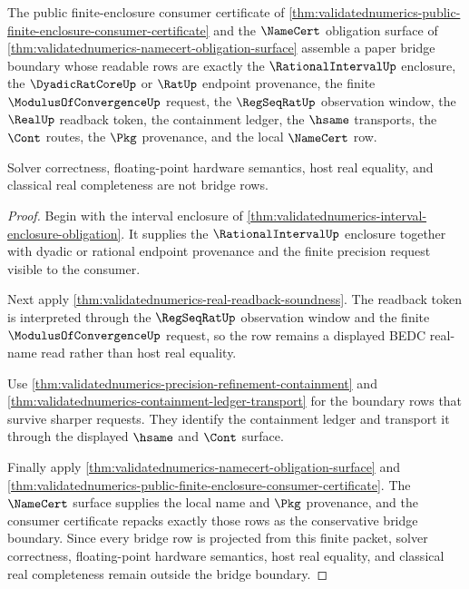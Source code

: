 \begin{theorem}
\label{thm:validatednumerics-validated-enclosure-bridge-boundary}
The public finite-enclosure consumer certificate of
\autoref{thm:validatednumerics-public-finite-enclosure-consumer-certificate}
and the $\NameCert$ obligation surface of
\autoref{thm:validatednumerics-namecert-obligation-surface} assemble a paper
bridge boundary whose readable rows are exactly the $\RationalIntervalUp$
enclosure, the $\DyadicRatCoreUp$ or $\RatUp$ endpoint provenance, the finite
$\ModulusOfConvergenceUp$ request, the $\RegSeqRatUp$ observation window, the
$\RealUp$ readback token, the containment ledger, the $\hsame$ transports, the
$\Cont$ routes, the $\Pkg$ provenance, and the local $\NameCert$ row.

Solver correctness, floating-point hardware semantics, host real equality, and
classical real completeness are not bridge rows.
\end{theorem}
\begin{proof}
Begin with the interval enclosure of
\autoref{thm:validatednumerics-interval-enclosure-obligation}. It supplies the
$\RationalIntervalUp$ enclosure together with dyadic or rational endpoint
provenance and the finite precision request visible to the consumer.

Next apply \autoref{thm:validatednumerics-real-readback-soundness}. The
readback token is interpreted through the $\RegSeqRatUp$ observation window and
the finite $\ModulusOfConvergenceUp$ request, so the row remains a displayed
BEDC real-name read rather than host real equality.

Use \autoref{thm:validatednumerics-precision-refinement-containment} and
\autoref{thm:validatednumerics-containment-ledger-transport} for the boundary
rows that survive sharper requests. They identify the containment ledger and
transport it through the displayed $\hsame$ and $\Cont$ surface.

Finally apply
\autoref{thm:validatednumerics-namecert-obligation-surface} and
\autoref{thm:validatednumerics-public-finite-enclosure-consumer-certificate}.
The $\NameCert$ surface supplies the local name and $\Pkg$ provenance, and the
consumer certificate repacks exactly those rows as the conservative bridge
boundary. Since every bridge row is projected from this finite packet, solver
correctness, floating-point hardware semantics, host real equality, and
classical real completeness remain outside the bridge boundary.
\end{proof}

